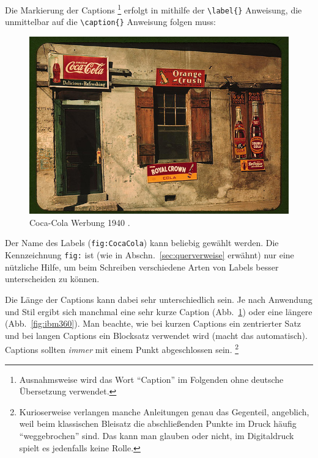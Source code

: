 Die Markierung der Captions%
\footnote{Ausnahmsweise wird das Wort "`Caption"' im Folgenden
ohne deutsche Übersetzung verwendet.} erfolgt in \latex mithilfe
der \verb!\label{}! Anweisung, die unmittelbar auf die
\verb!\caption{}! Anweisung folgen muss:
%
\begin{LaTeXCode}[numbers=none]
\begin{figure}
\centering
\includegraphics[width=.95\textwidth]{cola-public-domain-photo-p}
\caption{Coca-Cola Werbung 1940 \cite{CocaCola1940}.}
\label{fig:CocaCola}
\end{figure}
\end{LaTeXCode}
%
Der Name des Labels (\texttt{fig:CocaCola}) kann beliebig gewählt werden. 
Die Kennzeichnung \texttt{fig:} ist (wie in Abschn.\ \ref{sec:querverweise} 
erwähnt) nur eine nützliche Hilfe, um beim Schreiben verschiedene Arten 
von Labels besser unterscheiden zu können.

Die Länge der Captions kann dabei sehr unterschiedlich sein. Je
nach Anwendung und Stil ergibt sich manchmal eine sehr kurze
Caption (Abb.~\ref{fig:CocaCola}) oder eine längere
(Abb.~\ref{fig:ibm360}).
Man beachte, wie bei kurzen Captions ein
zentrierter Satz und bei langen Captions ein Blocksatz verwendet
wird (\latex macht das automatisch).
Captions sollten \emph{immer} mit einem Punkt abgeschlossen sein.%
\footnote{Kurioserweise verlangen manche Anleitungen
genau das Gegenteil, angeblich, weil beim klassischen Bleisatz 
die abschließenden Punkte im Druck häufig "`weggebrochen"' sind. 
Das kann man glauben oder nicht, im Digitaldruck 
spielt es jedenfalls keine Rolle.}

